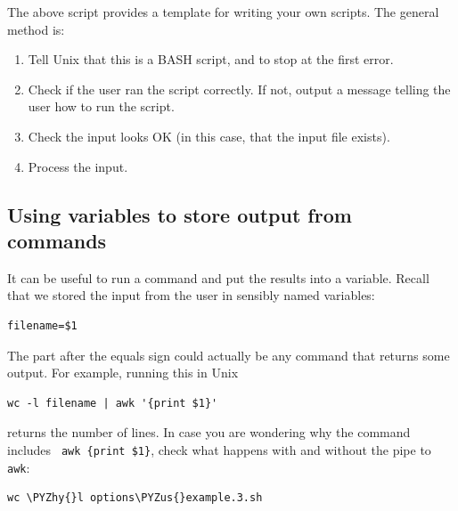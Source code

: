 \documentclass[11pt]{article}
\makeatletter
\providecommand{\tightlist}{%
      \setlength{\itemsep}{0pt}\setlength{\parskip}{0pt}}
\def\PYZus{\char`\_}
\def\PYZhy{\char`\-}
\newcommand{\boxspacing}{\kern\kvtcb@left@rule\kern\kvtcb@boxsep}
\newcommand{\prompt}[4]{
       \ttfamily\llap{{\color{#2}\LARGE\faKeyboardO\hspace{3pt}#4}}\vspace{-\baselineskip}
    }
\makeatother
\begin{document}
The above script provides a template for writing your own scripts. The
general method is:

\begin{enumerate}
\def\labelenumi{\arabic{enumi}.}
\tightlist
\item
  Tell Unix that this is a BASH script, and to stop at the first error.
\item
  Check if the user ran the script correctly. If not, output a message
  telling the user how to run the script.
\item
  Check the input looks OK (in this case, that the input file exists).
\item
  Process the input.
\end{enumerate}

\hypertarget{using-variables-to-store-output-from-commands}{%
\subsection{Using variables to store output from
commands}\label{using-variables-to-store-output-from-commands}}

It can be useful to run a command and put the results into a variable.
Recall that we stored the input from the user in sensibly named
variables:

\begin{verbatim}
filename=$1
\end{verbatim}

The part after the equals sign could actually be any command that
returns some output. For example, running this in Unix

\begin{verbatim}
wc -l filename | awk '{print $1}'
\end{verbatim}

returns the number of lines. In case you are wondering why the command
includes
\texttt{\textbar{}\ awk\ \textquotesingle{}\{print\ \$1\}\textquotesingle{}},
check what happens with and without the pipe to \texttt{awk}:

    \begin{tcolorbox}[breakable, size=fbox, boxrule=1pt, pad at break*=1mm,colback=cellbackground, colframe=cellborder]
\prompt{In}{incolor}{ }{\boxspacing}
\begin{Verbatim}[commandchars=\\\{\}]
wc \PYZhy{}l options\PYZus{}example.3.sh
\end{Verbatim}
\end{tcolorbox}
\end{document}
